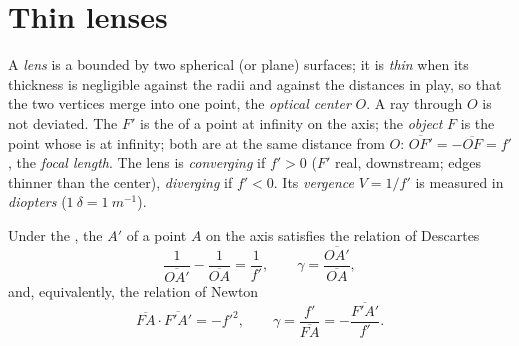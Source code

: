 \section{Thin lenses}

\begin{definition}\label{def:b1:mirrors-thin-lenses:lens}
A \emph{lens} is a  bounded by two spherical (or
plane) surfaces; it is \emph{thin} when its thickness is negligible
against the radii and against the distances in play, so that the two
vertices merge into one point, the \emph{optical center} $O$. A ray
through $O$ is not deviated. The \emph{ } $F'$ is the 
of a point at infinity on the axis; the \emph{object } $F$ is the
point whose  is at infinity; both are at the same distance from
$O$: $\overline{OF'} = -\overline{OF} = f'$, the \emph{focal length}.
The lens is \emph{converging} if $f' > 0$ ($F'$ real, downstream; edges
thinner than the center), \emph{diverging} if $f' < 0$. Its
\emph{vergence} $V = 1/f'$ is measured in \emph{diopters}
($\qty{1}{\delta} = \qty{1}{m^{-1}}$).
\end{definition}

\begin{theorem}\label{thm:b1:mirrors-thin-lenses:lensconj}
Under the , the  $A'$ of a point $A$ on the axis
satisfies the relation of Descartes
\[
\frac{1}{\overline{OA'}} - \frac{1}{\overline{OA}} = \frac{1}{f'},
\qquad
\gamma = \frac{\overline{OA'}}{\overline{OA}},
\]
and, equivalently, the relation of Newton
\[
\overline{FA}\cdot\overline{F'A'} = -f'^2,
\qquad
\gamma = \frac{f'}{\overline{FA}} = -\frac{\overline{F'A'}}{f'} .
\]
\end{theorem}

